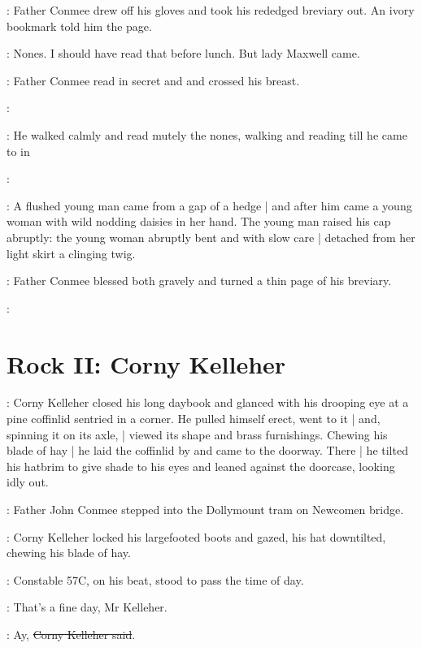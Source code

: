 :
Father Conmee drew off his gloves
and took his rededged breviary out.
An ivory bookmark told him the page.

\conmeeint:
Nones.
I should have read that before lunch.
But lady Maxwell came.

:
Father Conmee read in secret  and 
and crossed his breast.

\conmeeint:

:
He walked calmly and read mutely the nones,
walking and reading till
he came to
 in

\conmeeint:

:
A flushed young man came from a gap of a hedge |
and after him came a young woman
with wild nodding daisies in her hand.
The young man raised his cap abruptly:
the young woman abruptly bent
and with slow care |
detached from her light skirt a clinging twig.

:
Father Conmee blessed both gravely
and turned a thin page of his breviary.

\conmeeint:


\section*{Rock II: Corny Kelleher}

:
Corny Kelleher closed his long daybook
and glanced with his drooping eye
at a pine coffinlid sentried in a corner.
He pulled himself erect,
went to it |
and, spinning it on its axle, |
viewed its shape and brass furnishings.
Chewing his blade of hay |
he laid the coffinlid by and came to the doorway.
There |
he tilted his hatbrim to give shade to his eyes
and leaned against the doorcase,
looking idly out.

:
Father John Conmee stepped into the Dollymount tram on Newcomen bridge.

:
Corny Kelleher locked his largefooted boots and gazed,
his hat downtilted,
chewing his blade of hay.

:
Constable 57C,
on his beat,
stood to pass the time of day.

\constable:
That's a fine day, Mr Kelleher.

\corny:
Ay, \sout{Corny Kelleher said}.

